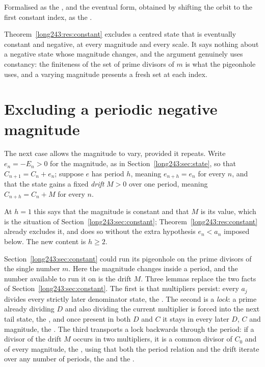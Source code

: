 \documentclass[11pt]{article}
\begin{document}
\noindent Formalised as the
, and the eventual form, obtained by shifting the orbit to the
first constant index, as the
.

Theorem~\ref{long243:res:constant} excludes a centred state that is eventually constant
and negative, at every magnitude and every scale.  It says nothing about a
negative state whose magnitude changes, and the argument genuinely uses
constancy: the finiteness of the set of prime divisors of $m$ is what the
pigeonhole uses, and a varying magnitude presents a fresh set at each index.

\section{Excluding a periodic negative magnitude}\label{long243:sec:periodic}

The next case allows the magnitude to vary, provided it repeats.  Write
$e_n=-E_n>0$ for the magnitude, as in Section~\ref{long243:sec:state}, so that
$C_{n+1}=C_n+e_n$; suppose $e$ has period $h$, meaning $e_{n+h}=e_n$ for every
$n$, and that the state gains a fixed \emph{drift} $M>0$ over one period,
meaning $C_{n+h}=C_n+M$ for every $n$.

At $h=1$ this says that the magnitude is constant and that $M$ is its value,
which is the situation of Section~\ref{long243:sec:constant};
Theorem~\ref{long243:res:constant} already excludes it, and does so without the extra
hypothesis $e_n<a_n$ imposed below.  The new content is $h\ge2$.

Section~\ref{long243:sec:constant} could run its pigeonhole on the prime divisors of
the single number $m$.  Here the magnitude changes inside a period, and the
number available to run it on is the drift $M$.  Three lemmas replace the two
facts of Section~\ref{long243:sec:constant}.  The first is
that multipliers persist: every $a_j$ divides every strictly later denominator
state, the
.  The second is a \emph{lock}: a prime already dividing $D$ and also
dividing the current multiplier is forced into the next tail state, the
, and once present in both $D$ and $C$ it stays in every later $D$, $C$
and magnitude, the
.  The third transports a lock backwards through the period: if a
divisor of the drift $M$ occurs in two multipliers, it is a common divisor of
$C_0$ and of every magnitude, the
, using that both the period relation and the drift iterate over any
number of periods, the
 and the
.
\end{document}
